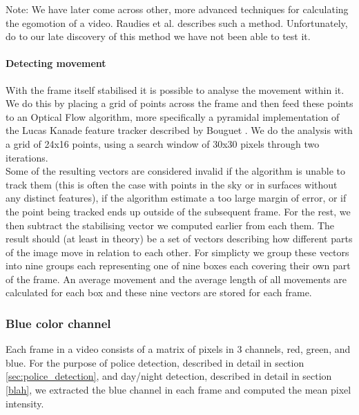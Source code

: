 %
Note: We have later come across other, more advanced techniques for calculating the egomotion of a video. Raudies et al. \cite{Raudies:2009:ELM:1612122.1612125} describes such a method.
Unfortunately, do to our late discovery of this method we have not been able to test it.
%
\paragraph{Detecting movement}
%
With the frame itself stabilised it is possible to analyse the movement within it. We do this by placing a grid of points across the frame and then feed these points to an Optical Flow algorithm, more specifically a pyramidal implementation of the Lucas Kanade feature tracker described by Bouguet \cite{Bouguet2000}. We do the analysis with a grid of 24x16 points, using a search window of 30x30 pixels through two iterations.\\%
Some of the resulting vectors are considered invalid if the algorithm is unable to track them (this is often the case with points in the sky or in surfaces without any distinct features), if the algorithm estimate a too large margin of error, or if the point being tracked ends up outside of the subsequent frame. For the rest, we then subtract the stabilising vector we computed earlier from each them. The result should (at least in theory) be a set of vectors describing how different parts of the image move in relation to each other. For simplicty we group these vectors into nine groups each representing one of nine boxes each covering their own part of the frame.
%
%
An average movement and the average length of all movements are calculated for each box and these nine vectors are stored for each frame.
%
%
\subsubsection{Blue color channel}\label{sec:blue_channel}
%
Each frame in a video consists of a matrix of pixels in 3 channels, red, green, and blue. For the purpose of police detection, described in detail in section \ref{sec:police_detection}, and day/night detection, described in detail in section \ref{blah}, we extracted the blue channel in each frame and computed the mean pixel intensity.
%
